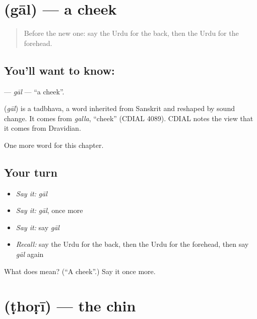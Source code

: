 \section[\texorpdfstring{\ur{گال} (gāl)}{گال (gāl)}]{ (gāl) — a cheek}

\label{lesson:UR-C129-gal}



\begin{quote}
Before the new one: say the Urdu for the back, then the Urdu for the forehead.
\end{quote}

\subsection*{You'll want to know: }
\textbf{} — \emph{gāl} — \textquotedblleft{}a cheek\textquotedblright{}.

\begin{cousinweb}
\textbf{} (\emph{gāl}) is a tadbhava, a word inherited from Sanskrit and reshaped by sound change. It comes from \emph{galla}, \textquotedblleft{}cheek\textquotedblright{} (CDIAL 4089). CDIAL notes the view that it comes from Dravidian.
\end{cousinweb}

\begin{grammarlens}[title={What you've built}]
One more word for this chapter.
\end{grammarlens}

\subsection*{Your turn}
\begin{itemize}
\raggedright
  \item \emph{Say it:} \emph{gāl}
  \item \emph{Say it:} \emph{gāl}, once more
  \item \emph{Say it:} say \emph{gāl}
  \item \emph{Recall:} say the Urdu for the back, then the Urdu for the forehead, then say \emph{gāl} again
\end{itemize}

\begin{tcolorbox}[breakable,colback=teal!4,colframe=teal!35!black,title={Before you move on}]
What does  mean? (\textquotedblleft{}A cheek\textquotedblright{}.) Say it once more.
\end{tcolorbox}
\section[\texorpdfstring{\ur{ٹھوڑی} (ṭhoṛī)}{ٹھوڑی (ṭhoṛī)}]{ (ṭhoṛī) — the chin}

